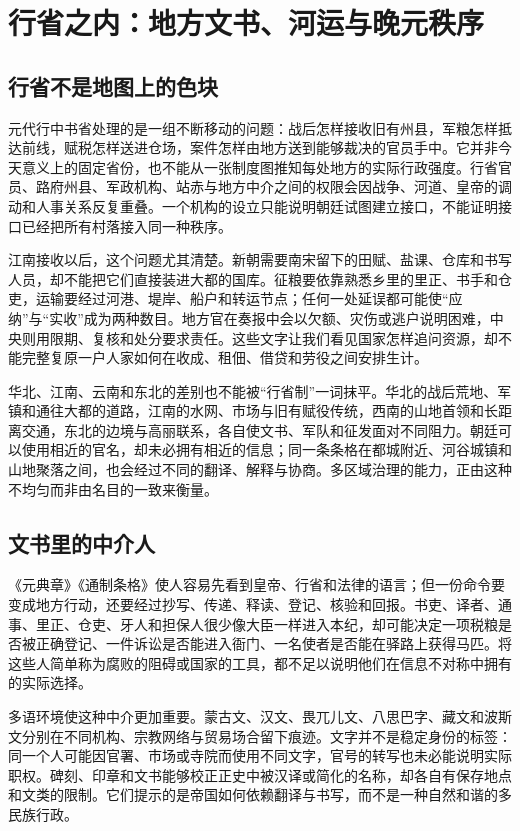 \section{行省之内：地方文书、河运与晚元秩序}

\subsection{行省不是地图上的色块}

元代行中书省处理的是一组不断移动的问题：战后怎样接收旧有州县，军粮怎样抵达前线，赋税怎样送进仓场，案件怎样由地方送到能够裁决的官员手中。它并非今天意义上的固定省份，也不能从一张制度图推知每处地方的实际行政强度。行省官员、路府州县、军政机构、站赤与地方中介之间的权限会因战争、河道、皇帝的调动和人事关系反复重叠。一个机构的设立只能说明朝廷试图建立接口，不能证明接口已经把所有村落接入同一种秩序。

江南接收以后，这个问题尤其清楚。新朝需要南宋留下的田赋、盐课、仓库和书写人员，却不能把它们直接装进大都的国库。征粮要依靠熟悉乡里的里正、书手和仓吏，运输要经过河港、堤岸、船户和转运节点；任何一处延误都可能使“应纳”与“实收”成为两种数目。地方官在奏报中会以欠额、灾伤或逃户说明困难，中央则用限期、复核和处分要求责任。这些文字让我们看见国家怎样追问资源，却不能完整复原一户人家如何在收成、租佃、借贷和劳役之间安排生计。

华北、江南、云南和东北的差别也不能被“行省制”一词抹平。华北的战后荒地、军镇和通往大都的道路，江南的水网、市场与旧有赋役传统，西南的山地首领和长距离交通，东北的边境与高丽联系，各自使文书、军队和征发面对不同阻力。朝廷可以使用相近的官名，却未必拥有相近的信息；同一条条格在都城附近、河谷城镇和山地聚落之间，也会经过不同的翻译、解释与协商。多区域治理的能力，正由这种不均匀而非由名目的一致来衡量。

\subsection{文书里的中介人}

《元典章》《通制条格》使人容易先看到皇帝、行省和法律的语言；但一份命令要变成地方行动，还要经过抄写、传递、释读、登记、核验和回报。书吏、译者、通事、里正、仓吏、牙人和担保人很少像大臣一样进入本纪，却可能决定一项税粮是否被正确登记、一件诉讼是否能进入衙门、一名使者是否能在驿路上获得马匹。将这些人简单称为腐败的阻碍或国家的工具，都不足以说明他们在信息不对称中拥有的实际选择。

多语环境使这种中介更加重要。蒙古文、汉文、畏兀儿文、八思巴字、藏文和波斯文分别在不同机构、宗教网络与贸易场合留下痕迹。文字并不是稳定身份的标签：同一个人可能因官署、市场或寺院而使用不同文字，官号的转写也未必能说明实际职权。碑刻、印章和文书能够校正正史中被汉译或简化的名称，却各自有保存地点和文类的限制。它们提示的是帝国如何依赖翻译与书写，而不是一种自然和谐的多民族行政。

